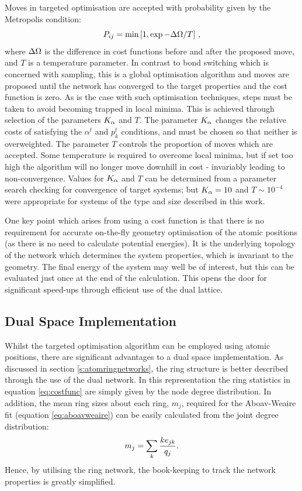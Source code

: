 Moves in targeted optimisation are accepted with probability given by the Metropolis condition:
\begin{equation}
	P_{ij}=\min\left[1,\exp{-\Delta\Omega/T}\right]\,,
\end{equation}
where $\Delta\Omega$ is the difference in cost functions before and after the proposed move, and $T$ is a temperature parameter. 
In contrast to bond switching which is concerned with sampling, this is a global optimisation algorithm and moves are proposed until the network has converged to the target properties and the cost function is zero.
As is the case with such optimisation techniques, steps must be taken to avoid becoming trapped in local minima. %
This is achieved through selection of the parameters $K_\alpha$ and $T$. 
The parameter $K_\alpha$ changes the relative costs of satisfying the $\alpha^t$ and $p_k^t$ conditions, and must be chosen so that neither is overweighted. The parameter $T$ controls the proportion of moves which are accepted. 
Some temperature is required to overcome local minima, but if set too high the algorithm will no longer move downhill in cost %
\-- invariably leading to non\--convergence. 
Values for $K_\alpha$ and $T$ can be determined from a parameter search checking for convergence of target systems; but $K_\alpha=10$ and $T\sim 10^{-4}$ were appropriate for systems of the type and size described in this work. 

One key point which arises from using a cost function is that there is no requirement for accurate on\--the\--fly geometry optimisation of the atomic positions (as there is no need to calculate potential energies).
It is the underlying topology of the network which determines the system properties, which is invariant to the geometry.
The final energy of the system may well be of interest, but this can be evaluated just once at the end of the calculation.
This opens the door for significant speed\--ups through efficient use of the dual lattice.

\subsection{Dual Space Implementation}

Whilst the targeted optimisation algorithm can be employed using atomic positions, there are significant advantages to a dual space implementation.
As discussed in section \ref{s:atomringnetworks}, the ring structure is better described through the use of the dual network. 
In this representation the ring statistics in equation \eqref{eq:costfunc} are simply given by the node degree distribution. 
In addition, the mean ring sizes about each ring, $m_j$, required for the Aboav\--Weaire fit (equation \eqref{eq:aboavweaire}) can be easily calculated from the joint degree distribution:
\begin{equation}
	\label{eq:mjejklink}
	m_j = \sum\limits_k \frac{ke_{jk}}{q_j}.
\end{equation}
Hence, by utilising the ring network, the book\--keeping to track the network properties is greatly simplified.

